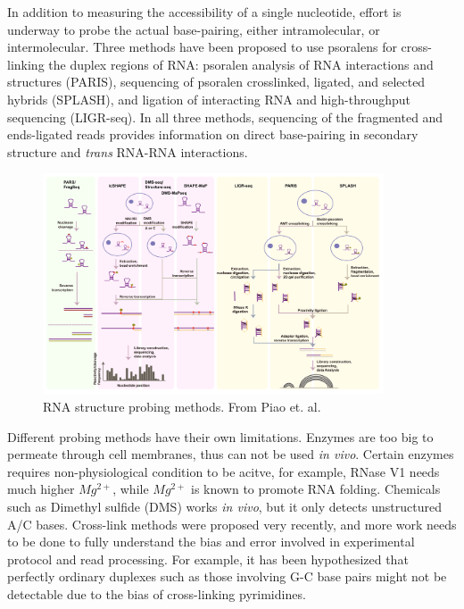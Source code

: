 \documentclass{proposal}
\begin{document}
In addition to measuring the accessibility of a single nucleotide,
effort is underway to probe the actual base-pairing, either intramolecular, or intermolecular.
Three methods have been proposed to use psoralens for cross-linking the duplex regions of RNA:
psoralen analysis of RNA interactions and structures (PARIS)\cite{lu2018paris},
sequencing of psoralen crosslinked, ligated, and selected hybrids (SPLASH)\cite{aw2016vivo}, and
ligation of interacting RNA and high-throughput sequencing (LIGR-seq)\cite{sharma2016global}.
In all three methods, sequencing of the fragmented and ends-ligated reads provides information on direct base-pairing in secondary structure and \textit{trans} RNA-RNA interactions.


\begin{figure}[h!]
    \centering
    \includegraphics[width=0.9\textwidth]{probing_methods.png}
    \caption{RNA structure probing methods. From Piao et. al\cite{piao2017rna}.}
    \label{fig:probing_methods}
    \centering
\end{figure}



Different probing methods have their own limitations.
Enzymes are too big to ﻿permeate through cell membranes, thus can not be used \textit{in vivo}.
Certain enzymes requires non-physiological condition to be acitve,
for example, ﻿RNase V1 needs much higher $Mg^{2+}$, while $Mg^{2+}$ is known to promote RNA folding.
Chemicals such as ﻿Dimethyl sulfide (DMS) works \textit{in vivo},
but it only detects unstructured A/C bases.
Cross-link methods were proposed very recently, and more work needs to be done to fully understand
 the bias and error involved in experimental protocol and read processing.
For example, it has been hypothesized that perfectly ordinary duplexes such as those
involving G-C base pairs might not be detectable due to the bias of cross-linking pyrimidines\cite{stefanov2018deciphering}.
\end{document}
